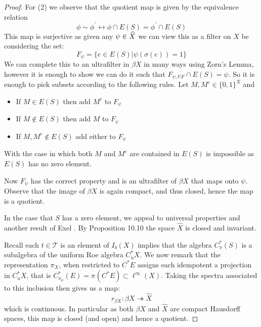 \begin{corollary}
\begin{proof}
For (2) we observe that the quotient map is given by the equivalence relation 
\begin{equation*}
\phi \sim \phi^{'} \leftrightarrow \phi \cap E(S) = \phi^{'} \cap E(S)
\end{equation*}
This map is surjective as given any $\psi \in \widehat{X}$ we can view this as a filter on $X$ be considering the set:
\begin{equation*}
F_{\psi} = \lbrace e \in E(S) | \psi(\sigma(e))=1 \rbrace
\end{equation*}
We can complete this to an ultrafilter in $\beta X$ in many ways using Zorn's Lemma, however it is enough to show we can do it such that $F_{\psi ,UF}\cap E(S) = \psi$. So it is enough to pick subsets according to the following rules. Let $M,M^{c} \in \lbrace 0,1 \rbrace^{X}$ and
\begin{itemize}
\item If $M \in E(S)$ then add $M^{c}$ to $F_{\psi}$
\item If $M \not\in E(S)$ then add $M$ to $F_{\psi}$
\item If $M,M^{c} \not \in E(S)$ add either to $F_{\psi}$
\end{itemize}
With the case in which both $M$ and $M^{c}$ are contained in $E(S)$ is impossible as $E(S)$ has no zero element.

Now $F_{\psi}$ has the correct property and is an ultrafilter of $\beta X$ that maps onto $\psi$. Observe that the image of $\beta X$ is again compact, and thus closed, hence the map is a quotient.

In the case that $S$ has a zero element, we appeal to universal properties and another result of Exel \cite{MR2419901}. By Proposition 10.10 \cite{MR2419901} the space $\widehat{X}$ is closed and invariant.

Recall each $t \in \mathcal{T}$ is an element of $I_{b}(X)$ implies that the algebra $C^{*}_{\pi}(S)$ is a subalgebra of the uniform Roe algebra $C^{*}_{u}X$. We now remark that the representation $\pi_{X}$, when restricted to $C^{*}E$ assigns each idempotent a projection in $C^{*}_{u}X$, that is $C^{*}_{\pi_{\mu}}(E)=\pi_{}(C^{*}E) \subset \ell^{\infty}(X)$. Taking the spectra associated to this inclusion then gives us a map:
\begin{equation*}
r_{\beta X}: \beta X \twoheadrightarrow \widehat{X}
\end{equation*}
which is continuous. In particular as both $\beta X$ and $\widehat{X}$ are compact Hausdorff spaces, this map is closed (and open) and hence a quotient.
\end{proof}


\end{corollary}
